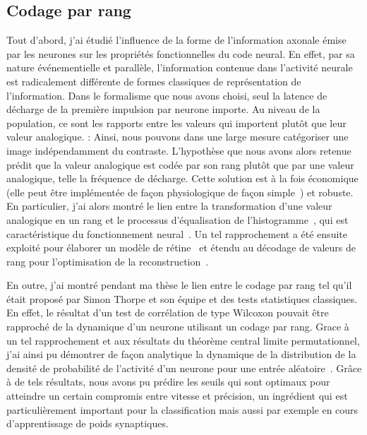 \documentclass[11pt,french,a4paper,oneside]{article}%
\begin{document}
\subsection{Codage par rang}
Tout d'abord, j'ai étudié l'influence de la forme de l'information axonale émise par les neurones sur les propriétés fonctionnelles du code neural. En effet, par sa nature événementielle et parallèle, l'information contenue dans l'activité neurale est radicalement différente de formes classiques de représentation de l'information. Dans le formalisme que nous avons choisi, seul la latence de décharge de la première impulsion par neurone importe. Au niveau de la population, ce sont les rapports entre les valeurs qui importent plutôt que leur valeur analogique. %
: Ainsi, nous pouvons dans une large mesure catégoriser une image indépendamment du contraste.
L'hypothèse que nous avons alors retenue prédit que la valeur analogique est codée par son rang plutôt que par une valeur analogique, telle la fréquence de décharge. Cette solution est à la fois économique (elle peut être implémentée de façon physiologique de façon simple~\citep{Delorme01}) et robuste. En particulier, j'ai alors montré le lien entre la transformation d'une valeur analogique en un rang et le processus d'équalisation de l'histogramme~\citep{Perrinet99}, qui est caractéristique du fonctionnement neural~\citep{Laughlin81}. Un tel rapprochement a été ensuite exploité pour élaborer un modèle de rétine~\citep{van-Rullen01a} et étendu au décodage de valeurs de rang pour l'optimisation de la reconstruction~\citep{Perrinet04a,Perrinet10shl}. %

En outre, j'ai montré pendant ma thèse le lien entre le codage par rang tel qu'il était proposé par Simon Thorpe et son équipe et des tests statistiques classiques. En effet, le résultat d'un test de corrélation de type Wilcoxon pouvait être rapproché de la dynamique d'un neurone utilisant un codage par rang. Grace à un tel rapprochement et aux résultats du théorème central limite permutationnel, j'ai ainsi pu démontrer de façon analytique la dynamique de la distribution de la densité de probabilité de l'activité d'un neurone pour une entrée aléatoire~\citep{Perrinet03these}. Grâce à de tels résultats, nous avons pu prédire les seuils qui sont optimaux pour atteindre un certain compromis entre vitesse et précision, un ingrédient qui est particulièrement important pour la classification mais aussi par exemple en cours d'apprentissage de poids synaptiques. %
%
\end{document}
